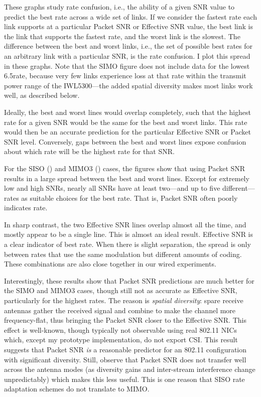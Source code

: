 These graphs study rate confusion, i.e., the ability of a given SNR value to predict the best rate across a wide set of links. If we consider the fastest rate each link supports at a particular Packet SNR or Effective SNR value, the best link is the link that supports the fastest rate, and the worst link is the slowest. The difference between the best and worst links, i.e., the set of possible best rates for an arbitrary link with a particular SNR, is the rate confusion. I plot this spread in these graphs. Note that the SIMO figure does not include data for the lowest 6.5\Mbps rate, because very few links experience loss at that rate within the transmit power range of the IWL5300---the added spatial diversity makes most links work well, as described below.

Ideally, the best and worst lines would overlap completely, such that the highest rate for a given SNR would be the same for the best and worst links. This rate would then be an accurate prediction for the particular Effective SNR or Packet SNR level. Conversely, gaps between the best and worst lines expose confusion about which rate will be the highest rate for that SNR.

For the SISO () and MIMO3 () cases, the figures show that using Packet SNR results in a large spread between the best and worst lines. Except for extremely low and high SNRs, nearly all SNRs have at least two---and up to five different---rates as suitable choices for the best rate. That is, Packet SNR often poorly indicates rate.

In sharp contrast, %
the two Effective SNR lines overlap almost all the time, and mostly appear to be a single line. This is almost an ideal result. Effective SNR is a clear indicator of best rate. When there is slight separation, the spread is only between rates that use the same modulation but different amounts of coding. These combinations are also close together in our wired experiments. 

Interestingly, these results show that Packet SNR predictions are much better for the SIMO and MIMO3 cases, though still not as accurate as Effective SNR, particularly for the highest rates. The reason is \emph{spatial diversity}: spare receive antennas gather the received signal and combine to make the channel more frequency-flat, thus bringing the Packet SNR closer to the Effective SNR. This effect is well-known, though typically not observable using real 802.11 NICs which, except my prototype implementation, do not export CSI. This result suggests that Packet SNR \emph{is} a reasonable predictor for an 802.11 configuration with significant diversity. Still, observe that Packet SNR does not transfer well across the antenna modes (as diversity gains and inter-stream interference change unpredictably) which makes this less useful. This is one reason that SISO rate adaptation schemes do not translate to MIMO.

